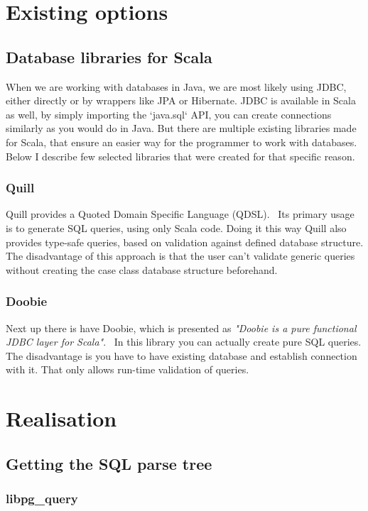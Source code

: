 \documentclass[thesis=B,english]{FITthesis}[2019/12/23]
\begin{document}
\chapter{Existing options}
\section{Database libraries for Scala}
When we are working with databases in Java, we are most likely using JDBC, either directly or by wrappers like JPA or Hibernate. JDBC is available in Scala as well, by simply importing the `java.sql` API, you can create connections similarly as you would do in Java. But there are multiple existing libraries made for Scala, that ensure an easier way for the programmer to work with databases. Below I describe few selected libraries that were created for that specific reason.


\subsection{Quill}
Quill provides a Quoted Domain Specific Language (QDSL).~\cite{Quill} Its primary usage is to generate SQL queries, using only Scala code. Doing it this way Quill also provides type-safe queries, based on validation against defined database structure. The disadvantage of this approach is that the user can't validate generic queries without creating the case class database structure beforehand.

\subsection{Doobie}
Next up there is have Doobie, which is presented as \textit{"Doobie is a pure functional JDBC layer for Scala"}.~\cite{Doobie} In this library you can actually create pure SQL queries. The disadvantage is you have to have existing database and establish connection with it. That only allows run-time validation of queries.

\chapter{Realisation}

\section{Getting the SQL parse tree}

\subsection{libpg\_query}
\end{document}
